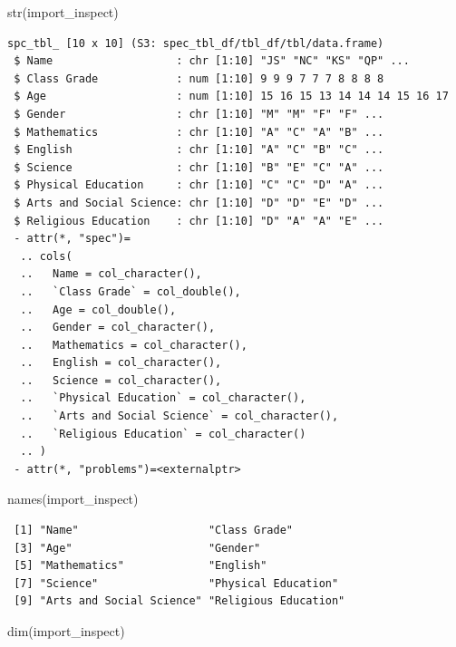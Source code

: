 \documentclass[
  letterpaper,
  DIV=11,
  numbers=noendperiod]{scrreprt}
\newenvironment{Shaded}{\begin{snugshade}}{\end{snugshade}}
\newcommand{\FunctionTok}[1]{\textcolor[rgb]{0.28,0.35,0.67}{#1}}
\newcommand{\NormalTok}[1]{\textcolor[rgb]{0.00,0.23,0.31}{#1}}
\begin{document}
\begin{Shaded}
\begin{Highlighting}[]
\FunctionTok{str}\NormalTok{(import\_inspect)}
\end{Highlighting}
\end{Shaded}

\begin{verbatim}
spc_tbl_ [10 x 10] (S3: spec_tbl_df/tbl_df/tbl/data.frame)
 $ Name                   : chr [1:10] "JS" "NC" "KS" "QP" ...
 $ Class Grade            : num [1:10] 9 9 9 7 7 7 8 8 8 8
 $ Age                    : num [1:10] 15 16 15 13 14 14 14 15 16 17
 $ Gender                 : chr [1:10] "M" "M" "F" "F" ...
 $ Mathematics            : chr [1:10] "A" "C" "A" "B" ...
 $ English                : chr [1:10] "A" "C" "B" "C" ...
 $ Science                : chr [1:10] "B" "E" "C" "A" ...
 $ Physical Education     : chr [1:10] "C" "C" "D" "A" ...
 $ Arts and Social Science: chr [1:10] "D" "D" "E" "D" ...
 $ Religious Education    : chr [1:10] "D" "A" "A" "E" ...
 - attr(*, "spec")=
  .. cols(
  ..   Name = col_character(),
  ..   `Class Grade` = col_double(),
  ..   Age = col_double(),
  ..   Gender = col_character(),
  ..   Mathematics = col_character(),
  ..   English = col_character(),
  ..   Science = col_character(),
  ..   `Physical Education` = col_character(),
  ..   `Arts and Social Science` = col_character(),
  ..   `Religious Education` = col_character()
  .. )
 - attr(*, "problems")=<externalptr> 
\end{verbatim}

\begin{Shaded}
\begin{Highlighting}[]
\FunctionTok{names}\NormalTok{(import\_inspect)}
\end{Highlighting}
\end{Shaded}

\begin{verbatim}
 [1] "Name"                    "Class Grade"            
 [3] "Age"                     "Gender"                 
 [5] "Mathematics"             "English"                
 [7] "Science"                 "Physical Education"     
 [9] "Arts and Social Science" "Religious Education"    
\end{verbatim}

\begin{Shaded}
\begin{Highlighting}[]
\FunctionTok{dim}\NormalTok{(import\_inspect)}
\end{Highlighting}
\end{Shaded}
\end{document}
